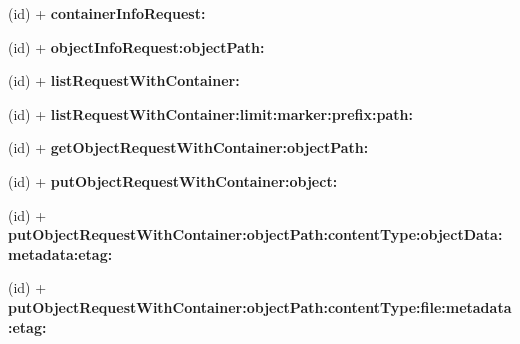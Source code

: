 \begin{DoxyCompactItemize}
\item 
\hypertarget{interface_a_s_i_cloud_files_object_request_ab9af59ae6c15be52c702e45fca805db9}{
(id) + {\bfseries container\-Info\-Request\-:}}
\label{interface_a_s_i_cloud_files_object_request_ab9af59ae6c15be52c702e45fca805db9}

\item 
\hypertarget{interface_a_s_i_cloud_files_object_request_a4b4f0ea695cdec431818f4ca24a8a1cf}{
(id) + {\bfseries object\-Info\-Request\-:object\-Path\-:}}
\label{interface_a_s_i_cloud_files_object_request_a4b4f0ea695cdec431818f4ca24a8a1cf}

\item 
\hypertarget{interface_a_s_i_cloud_files_object_request_ad140f7f65fef97218ff5a8853afbc0c7}{
(id) + {\bfseries list\-Request\-With\-Container\-:}}
\label{interface_a_s_i_cloud_files_object_request_ad140f7f65fef97218ff5a8853afbc0c7}

\item 
\hypertarget{interface_a_s_i_cloud_files_object_request_a67e5f2848052dcdf80aac2ffd4f64525}{
(id) + {\bfseries list\-Request\-With\-Container\-:limit\-:marker\-:prefix\-:path\-:}}
\label{interface_a_s_i_cloud_files_object_request_a67e5f2848052dcdf80aac2ffd4f64525}

\item 
\hypertarget{interface_a_s_i_cloud_files_object_request_ac41ac1686f40dd0b25f473b95de56a2b}{
(id) + {\bfseries get\-Object\-Request\-With\-Container\-:object\-Path\-:}}
\label{interface_a_s_i_cloud_files_object_request_ac41ac1686f40dd0b25f473b95de56a2b}

\item 
\hypertarget{interface_a_s_i_cloud_files_object_request_ac9c57b5595d42ea6fdb13b9baa5ad073}{
(id) + {\bfseries put\-Object\-Request\-With\-Container\-:object\-:}}
\label{interface_a_s_i_cloud_files_object_request_ac9c57b5595d42ea6fdb13b9baa5ad073}

\item 
\hypertarget{interface_a_s_i_cloud_files_object_request_a51fd51b32cb64756aa6fbc3f50ff7df4}{
(id) + {\bfseries put\-Object\-Request\-With\-Container\-:object\-Path\-:content\-Type\-:object\-Data\-:metadata\-:etag\-:}}
\label{interface_a_s_i_cloud_files_object_request_a51fd51b32cb64756aa6fbc3f50ff7df4}

\item 
\hypertarget{interface_a_s_i_cloud_files_object_request_a4fd2c82bc1702341d5a482f7ff46db4b}{
(id) + {\bfseries put\-Object\-Request\-With\-Container\-:object\-Path\-:content\-Type\-:file\-:metadata\-:etag\-:}}
\label{interface_a_s_i_cloud_files_object_request_a4fd2c82bc1702341d5a482f7ff46db4b}


\end{DoxyCompactItemize}
